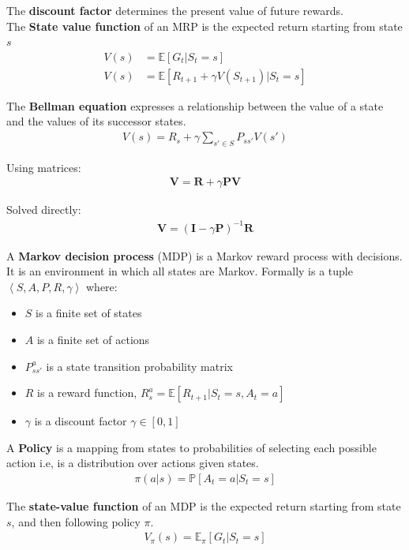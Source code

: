 \documentclass[journal]{IEEEtran}
\begin{document}
The \textbf{discount factor} determines the present value of future rewards. \\

The \textbf{State value function} of an MRP is the expected return
starting from state $s$
\begin{align*}
V(s) &= \mathbb{E} [G_t|S_t=s] \\
V(s) &= \mathbb{E} [R_{t+1} + \gamma V(S_{t+1})|S_t = s]
\end{align*} 

The \textbf{Bellman equation} expresses a relationship between the value of a state and the values of its successor states.
\begin{align*}
V(s) = R_s + \gamma \sum_{s'\in S} P_{ss'}V(s')
\end{align*}

Using matrices:
\begin{align*}
\mathbf{V} = \mathbf{R} + \gamma \mathbf{P}\mathbf{V}
\end{align*}

Solved directly:
\begin{align*}
\mathbf{V} = (\mathbf{I} - \gamma \mathbf{P})^{-1}\mathbf{R}
\end{align*}

A \textbf{Markov decision process} (MDP) is a Markov reward process with decisions. It is an environment in which all states are Markov. Formally is a tuple $\left\langle S, A, P, R, \gamma \right\rangle$ where:
\begin{itemize}
	\item $S$ is a finite set of states
	\item $A$ is a finite set of actions
	\item $P_{ss'}^a$ is a state transition probability matrix
	\item $R$ is a reward function, $R_s^a = \mathbb{E} [R_{t+1}|S_t=s,A_t=a]$
	\item $\gamma$ is a discount factor $\gamma \in [0,1]$
\end{itemize}

A \textbf{Policy} is a mapping from states to probabilities of selecting each possible action i.e, is a distribution over actions given states.
\begin{align*}
\pi(a|s) = \mathbb{P} [A_t=a|S_t =s] 
\end{align*}

The \textbf{state-value function} of an MDP is the expected return starting from state $s$, and then following policy $\pi$.
\begin{align*}
V_\pi (s) = \mathbb{E}_\pi [G_t|S_t=s]
\end{align*}
\end{document}
